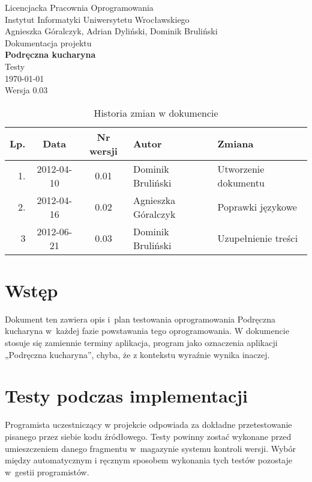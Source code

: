 \documentclass[12pt,leqno, twoside]{mwart}
\begin{document}
\thispagestyle{empty}
\begin{center}
Licencjacka Pracownia Oprogramowania \\ Instytut
Informatyki Uniwersytetu Wrocławskiego \\
\vspace{4cm}
\Large Agnieszka Góralczyk, Adrian Dyliński, Dominik Bruliński \\
\vspace{0.5cm}
\huge Dokumentacja projektu\\ \textbf{Podręczna kucharyna}\\ \Large Testy\\
\vspace{1cm}
\normalsize \today \\
\vspace{2cm}
\normalsize Wersja 0.03
\end{center}

\newpage


\begin{table}
	\centering
	\caption{Historia zmian w dokumencie}
		\begin{tabular}{|r|c|c|l|l|}
		\hline
		Lp. & Data       & Nr wersji & Autor               & Zmiana \\ \hline
		1.   & 2012-04-10 & 0.01 & Dominik Bruliński & Utworzenie dokumentu \\ \hline
		2. & 2012-04-16 & 0.02 & Agnieszka Góralczyk & Poprawki językowe\\ \hline
		3 & 2012-06-21 & 0.03 & Dominik Bruliński & Uzupełnienie treści \\ \hline
		\end{tabular}
\end{table}

\newpage

\tableofcontents
\newpage

\section{Wstęp}
\noindent Dokument ten zawiera opis i~plan testowania oprogramowania Podręczna kucharyna w~każdej fazie powstawania tego oprogramowania. W dokumencie stosuje się zamiennie terminy aplikacja, program jako oznaczenia aplikacji „Podręczna kucharyna”, chyba, że z kontekstu wyraźnie wynika inaczej.

\section{Testy podczas implementacji}
\noindent Programista uczestniczący w projekcie odpowiada za dokładne przetestowanie pisanego przez siebie kodu źródłowego. Testy powinny zostać wykonane przed umieszczeniem danego fragmentu w~magazynie systemu kontroli wersji. 
Wybór między automatycznym i ręcznym sposobem wykonania tych testów pozostaje w~gestii programistów.
\end{document}
